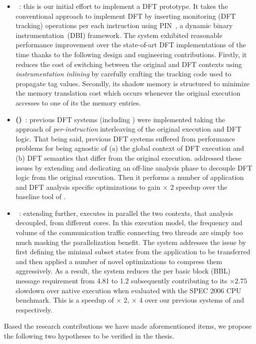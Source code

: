 \begin{itemize}
%
%
\item {\bf \libdft}~\cite{libdft}: this is our initial effort to implement a DFT
prototype. It takes the conventional approach to implement DFT by inserting
monitoring (\ie DFT tracking) operations per each instruction using
PIN~\cite{pin:pldi2005}, a dynamic binary instrumentation~(DBI) framework. The
system exhibited reasonable performance improvement over the state-of-art DFT
implementations of the time thanks to the following design and engineering
contributions. Firstly, it reduces the cost of switching between the original
and DFT contexts using {\it instrumentation inlining} by carefully crafting the
tracking code used to propagate tag values.  Secondly, its shadow memory is
structured to minimize the memory translation cost which occurs whenever the
original execution accesses to one of its the memory entries.

\item {\bf \tfafull (\tfa)}~\cite{tfa:ndss2012}: previous DFT systems (including
\libdft) were implemented taking the approach of {\it per-instruction}
interleaving of the original execution and DFT logic. That being said, previous
DFT systems suffered from performance problems for being agnostic of  (a) the
global context of DFT execution and (b) DFT semantics that differ from the
original execution. \tfa addressed these issues by extending \libdft and
dedicating an off-line analysis phase to decouple DFT logic from the original
execution.  Then it performs a number of application and DFT analysis specific
optimizations to gain $\times$ 2 speedup over the baseline tool of \libdft.

\item {\bf \sreplica}~\cite{sreplica:ccs2013}: extending \tfa further, \sreplica
executes in parallel the two contexts, that \tfa analysis decoupled, from
different cores.  In this execution model, the frequency and volume of the
communication traffic connecting two threads are simply too much masking the
parallelization benefit. The system addresses the issue by first defining the
minimal subset states from the application to be transferred and then applied a
number of novel optimizations to compress them aggressively. As a result, the
system reduces the per basic block (BBL) message requirement from 4.81 to 1.2
subsequently contributing to its $\times 2.75$ slowdown over native execution
when evaluated with the SPEC 2006 CPU benchmark. This is a speedup of $\times$
2, $\times$ 4 over our previous systems of \libdft and \tfa respectively.
\end{itemize}
Based the research contributions we have made aforementioned items, we propose
the following two hypotheses to be verified in the thesis.

